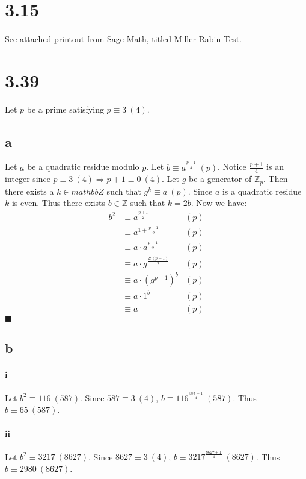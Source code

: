 \documentclass[letterpaper,12pt,oneside,onecolumn]{report}
\begin{document}
\section*{3.15}
\paragraph{}
See attached printout from Sage Math, titled Miller-Rabin Test.
\section*{3.39}
Let $p$ be a prime satisfying $p \equiv 3\ (4)$.
\subsection*{a}
Let $a$ be a quadratic residue modulo $p$. Let $b \equiv a^{\frac{p+1}{4}}\ (p)$. Notice $\frac{p+1}{4}$ is an integer since $p \equiv 3\ (4) \Rightarrow p + 1 \equiv 0\ (4)$. Let $g$ be a generator of $\mathbb{Z}_p$. Then there exists a $k \in mathbb{Z}$ such that $g^k \equiv a\ (p)$. Since $a$ is a quadratic residue $k$ is even. Thus there exists $b \in \mathbb{Z}$ such that $k = 2b$. Now we have:
\begin{align*}
b^2 &\equiv a^{\frac{p+1}{2}} &(p)\\
&\equiv a^{1 + \frac{p-1}{2}} &(p)\\
&\equiv a\cdot a^{\frac{p-1}{2}} &(p)\\
&\equiv a\cdot g^{\frac{2b(p-1)}{2}} &(p)\\
&\equiv a\cdot (g^{p-1})^b &(p)\\
&\equiv a\cdot 1^b &(p)\\
&\equiv a &(p)
\end{align*} $\blacksquare$
\subsection*{b}
\paragraph{i}
Let $b^2 \equiv 116\ (587)$. Since $587 \equiv 3\ (4)$, $b \equiv 116^{\frac{587 + 1}{4}}\ (587)$. Thus $b \equiv 65\ (587)$.
\paragraph{ii}
Let $b^2 \equiv 3217 \ (8627)$. Since $8627 \equiv 3\ (4)$, $b \equiv 3217 ^{\frac{8627 + 1}{4}}\ (8627)$. Thus $b \equiv 2980\ (8627)$.
\end{document}

